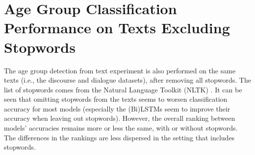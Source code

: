 \section{Age Group Classification Performance on Texts Excluding Stopwords}

The age group detection from text experiment is also performed on the same texts (i.e., the discourse and dialogue datasets), after removing all stopwords. The list of stopwords comes from the Natural Language Toolkit (NLTK) \citep{bird2009natural}. 
It can be seen that omitting stopwords from the texts seems to worsen classification accuracy for most models (especially the (Bi)LSTMs seem to improve their accuracy when leaving out stopwords). However, the overall ranking between models' accuracies remains more or less the same, with or without stopwords. The differences in the rankings are less dispersed in the setting that includes stopwords.

